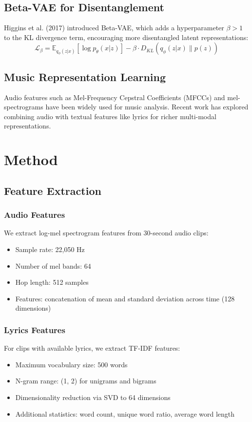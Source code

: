 \documentclass{article}
\begin{document}
\subsection{Beta-VAE for Disentanglement}
Higgins et al. (2017) introduced Beta-VAE, which adds a hyperparameter $\beta > 1$ to the KL divergence term, encouraging more disentangled latent representations:
\begin{equation}
\mathcal{L}_{\beta} = \mathbb{E}_{q_\phi(z|x)}[\log p_\theta(x|z)] - \beta \cdot D_{KL}(q_\phi(z|x) \| p(z))
\end{equation}

\subsection{Music Representation Learning}
Audio features such as Mel-Frequency Cepstral Coefficients (MFCCs) and mel-spectrograms have been widely used for music analysis. Recent work has explored combining audio with textual features like lyrics for richer multi-modal representations.

\section{Method}

\subsection{Feature Extraction}

\subsubsection{Audio Features}
We extract log-mel spectrogram features from 30-second audio clips:
\begin{itemize}
    \item Sample rate: 22,050 Hz
    \item Number of mel bands: 64
    \item Hop length: 512 samples
    \item Features: concatenation of mean and standard deviation across time (128 dimensions)
\end{itemize}

\subsubsection{Lyrics Features}
For clips with available lyrics, we extract TF-IDF features:
\begin{itemize}
    \item Maximum vocabulary size: 500 words
    \item N-gram range: (1, 2) for unigrams and bigrams
    \item Dimensionality reduction via SVD to 64 dimensions
    \item Additional statistics: word count, unique word ratio, average word length
\end{itemize}
\end{document}
